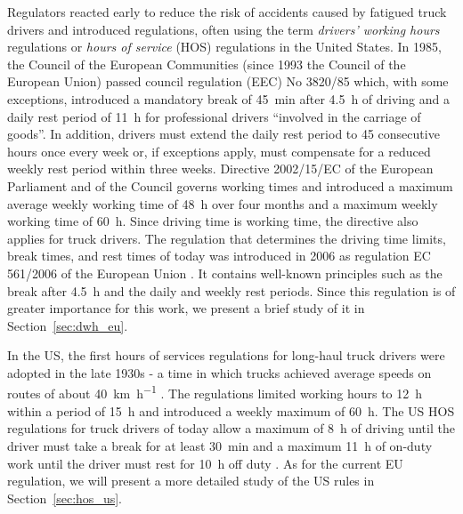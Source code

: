 Regulators reacted early to reduce the risk of accidents caused by fatigued truck drivers and introduced regulations, often using the term \emph{drivers' working hours} regulations or \emph{hours of service} (HOS) regulations in the United States. In 1985, the Council of the European Communities (since 1993 the Council of the European Union) passed council regulation (EEC) No 3820/85 \cite{counciloftheeuropeancommunities:1985} which, with some exceptions, introduced a mandatory break of \SI{45}{\minute} after \SI{4.5}{\hour} of driving and a daily rest period of \SI{11}{\hour} for professional drivers ``involved in the carriage of goods''. In addition, drivers must extend the daily rest period to \si{45} consecutive hours once every week or, if exceptions apply, must compensate for a reduced weekly rest period within three weeks. Directive 2002/15/EC \cite{europeanparliament:2002} of the European Parliament and of the Council governs working times and introduced a maximum average weekly working time of \SI{48}{\hour} over four months and a maximum weekly working time of \SI{60}{\hour}. Since driving time is working time, the directive also applies for truck drivers. The regulation that determines the driving time limits, break times, and rest times of today was introduced in 2006 as regulation EC 561/2006 of the European Union \cite{europeanparliament:2006}. It contains well-known principles such as the break after \SI{4.5}{\hour} and the daily and weekly rest periods. Since this regulation is of greater importance for this work, we present a brief study of it in Section~\ref{sec:dwh_eu}.

In the US, the first hours of services regulations for long-haul truck drivers were adopted in the late 1930s - a time in which trucks achieved average speeds on routes of about \SI[per-mode = symbol]{40}{\km\per\hour} \cite{federalmotorcarriersafetyadministrationfmcsa:2000}. The regulations limited working hours to \SI{12}{\hour} within a period of \SI{15}{\hour} and introduced a weekly maximum of \SI{60}{\hour}. The US HOS regulations for truck drivers of today allow a maximum of \SI{8}{\hour} of driving until the driver must take a break for at least \SI{30}{\minute} and a maximum \SI{11}{\hour} of on-duty work until the driver must rest for \SI{10}{\hour} off duty \cite{federalmotorcarriersafetyadministrationfmcsa:2011}. As for the current EU regulation, we will present a more detailed study of the US rules in Section~\ref{sec:hos_us}.

